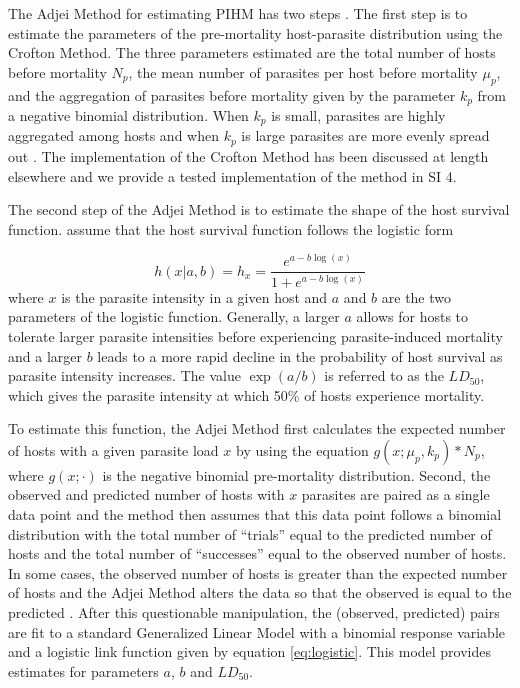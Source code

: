 \documentclass[12pt, a4paper]{article}
\begin{document}
The Adjei Method for estimating PIHM has two steps \citep{Adjei1986}.  The first
step is to estimate the parameters of the pre-mortality host-parasite
distribution using the Crofton Method.  The three parameters estimated are the
total number of hosts before mortality $N_p$,  the mean number of parasites per
host before mortality $\mu_p$, and the aggregation of parasites before
mortality given by the parameter $k_p$ from a negative binomial distribution.
When $k_p$ is small, parasites are highly aggregated among hosts and when
$k_p$ is large parasites are more evenly spread out \citep{Wilson2002}.  The implementation of the Crofton Method has been discussed at length elsewhere \citep[e.g.][ and above]{Royce1990,Lester1984} and we provide a tested implementation of the method in SI 4.

The second step of the Adjei Method is to estimate the shape of the host survival function. \cite{Adjei1986} assume that the host survival function follows the logistic form

\begin{equation}
    h(x | a, b) = h_x = \dfrac{e^{a - b \log(x)}}{1 + e^{a - b \log(x)}}
    \label{eq:logistic}
\end{equation}
where $x$ is the parasite intensity in a given host and $a$ and $b$ are the two
parameters of the logistic function. Generally, a larger $a$ allows for hosts to
tolerate larger parasite intensities before experiencing parasite-induced mortality
and a larger $b$ leads to a more rapid decline in the probability of host
survival as parasite intensity increases.  The value $\exp(a / b)$ is referred
to as the $LD_{50}$, which gives the parasite intensity at which 50\% of hosts
experience mortality.

To estimate this function, the Adjei Method first
calculates the expected number of hosts with a given parasite load $x$ by using
the equation $g(x ; \mu_p, k_p) * N_p$, where $g(x ; \cdot)$ is the negative binomial pre-mortality distribution.  Second, the observed and predicted number of hosts
with $x$ parasites are paired as a single data point and the method then assumes that
this data point follows a binomial distribution with the total number of
``trials'' equal to the predicted number of hosts and the total number of
``successes'' equal to the observed number of hosts. In some cases, the
observed number of hosts is greater than the expected number of hosts and the
Adjei Method alters the data so that the observed is equal to the predicted
\citep{Adjei1986}.  After this questionable manipulation, the (observed, predicted) pairs are fit to a standard Generalized Linear Model \citep{McCullagh1989} with a binomial response variable and a logistic link function given by equation \ref{eq:logistic}.  This model provides estimates for parameters $a$, $b$ and $LD_{50}$.
\end{document}
